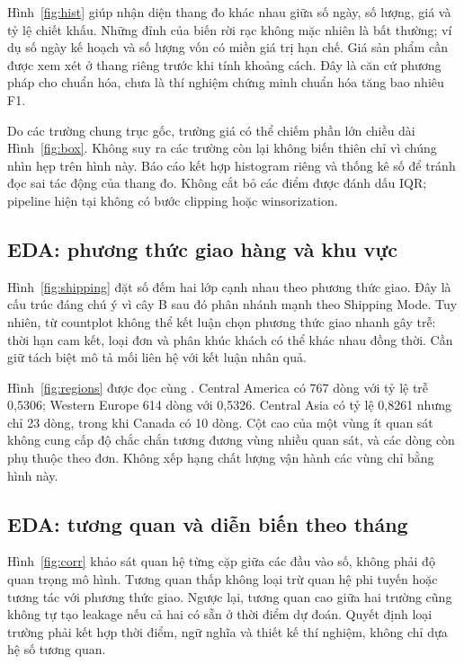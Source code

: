 Hình~\ref{fig:hist} giúp nhận diện thang đo khác nhau giữa số ngày, số
lượng, giá và tỷ lệ chiết khấu. Những đỉnh của biến rời rạc không mặc
nhiên là bất thường; ví dụ số ngày kế hoạch và số lượng vốn có miền giá
trị hạn chế. Giá sản phẩm cần được xem xét ở thang riêng trước khi tính
khoảng cách. Đây là căn cứ phương pháp cho chuẩn hóa, chưa là thí nghiệm
chứng minh chuẩn hóa tăng bao nhiêu F1.

Do các trường chung trục gốc, trường giá có thể chiếm phần lớn chiều dài
Hình~\ref{fig:box}. Không suy ra các trường còn lại không biến thiên chỉ
vì chúng nhìn hẹp trên hình này. Báo cáo kết hợp histogram riêng và thống
kê số để tránh đọc sai tác động của thang đo. Không cắt bỏ các điểm được
đánh dấu IQR; pipeline hiện tại không có bước clipping hoặc winsorization.

\subsection{EDA: phương thức giao hàng và khu vực}
Hình~\ref{fig:shipping} đặt số đếm hai lớp cạnh nhau theo phương thức
giao. Đây là cấu trúc đáng chú ý vì cây B sau đó phân nhánh mạnh theo
Shipping Mode. Tuy nhiên, từ countplot không thể kết luận chọn phương
thức giao nhanh gây trễ: thời hạn cam kết, loại đơn và phân khúc khách
có thể khác nhau đồng thời. Cần giữ tách biệt mô tả mối liên hệ với kết
luận nhân quả.

Hình~\ref{fig:regions} được đọc cùng .
Central America có 767 dòng với tỷ lệ trễ 0,5306; Western Europe 614 dòng
với 0,5326. Central Asia có tỷ lệ 0,8261 nhưng chỉ 23 dòng, trong khi
Canada có 10 dòng. Cột cao của một vùng ít quan sát không cung cấp độ
chắc chắn tương đương vùng nhiều quan sát, và các dòng còn phụ thuộc theo
đơn. Không xếp hạng chất lượng vận hành các vùng chỉ bằng hình này.

\subsection{EDA: tương quan và diễn biến theo tháng}
Hình~\ref{fig:corr} khảo sát quan hệ từng cặp giữa các đầu vào số, không
phải độ quan trọng mô hình. Tương quan thấp không loại trừ quan hệ phi
tuyến hoặc tương tác với phương thức giao. Ngược lại, tương quan cao
giữa hai trường cũng không tự tạo leakage nếu cả hai có sẵn ở thời điểm
dự đoán. Quyết định loại trường phải kết hợp thời điểm, ngữ nghĩa và
thiết kế thí nghiệm, không chỉ dựa hệ số tương quan.

